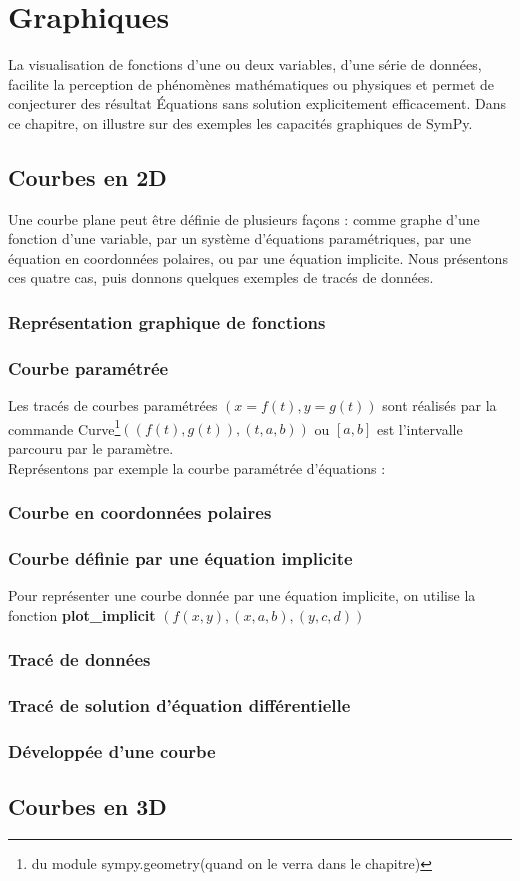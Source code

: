  \chapter{Graphiques}
La visualisation de fonctions d'une ou deux variables, d'une série de données, facilite la perception de phénomènes mathématiques ou physiques et permet de conjecturer des résultat Équations sans solution explicitement efficacement. Dans ce chapitre, on illustre sur des exemples les capacités graphiques de SymPy.
 \section{Courbes en 2D}
 Une courbe plane peut être définie de plusieurs façons : comme graphe d'une fonction d'une variable, par un système d'équations paramétriques, par une équation en coordonnées polaires, ou par une équation implicite. Nous présentons
ces quatre cas, puis donnons quelques exemples de tracés de données.
 \subsection{Représentation graphique de fonctions}
 \subsection{Courbe paramétrée}
 Les tracés de courbes paramétrées $(x = f(t), y=g(t))$ sont réalisés par la commande Curve\footnote{du module sympy.geometry(quand on le verra dans le chapitre)}$((f(t), g(t)), (t, a, b))$ ou $\left[a, b\right]$ est l'intervalle parcouru par le paramètre.
 \\
 Représentons par exemple la courbe paramétrée d'équations :
  
 \subsection{Courbe en coordonnées polaires}
 \subsection{Courbe définie par une équation implicite}
 Pour représenter une courbe donnée par une équation implicite, on utilise la fonction \textbf{plot\_implicit}
 $(f(x, y), (x, a, b), (y, c, d))$
 \subsection{Tracé de données}
 \subsection{Tracé de solution d'équation différentielle}
 
 \subsection{Développée d'une courbe}
 \section{Courbes en 3D}   
